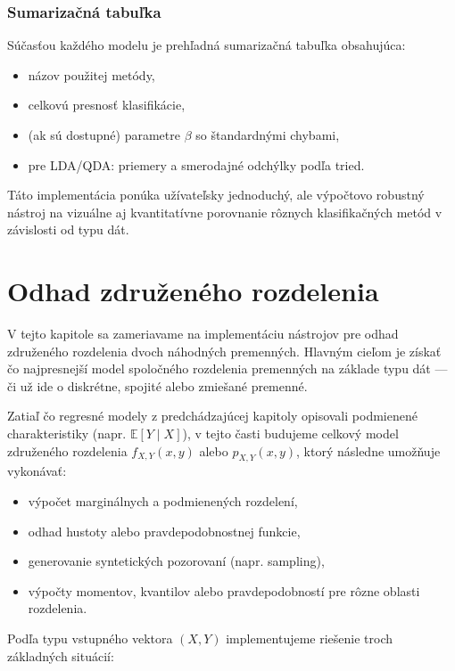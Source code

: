 \subsubsection{Sumarizačná tabuľka}

Súčasťou každého modelu je prehľadná sumarizačná tabuľka obsahujúca:

\begin{itemize}
  \item názov použitej metódy,
  \item celkovú presnosť klasifikácie,
  \item (ak sú dostupné) parametre $\beta$ so štandardnými chybami,
  \item pre LDA/QDA: priemery a smerodajné odchýlky podľa tried.
\end{itemize}

Táto implementácia ponúka užívateľsky jednoduchý, ale výpočtovo robustný nástroj na vizuálne aj kvantitatívne porovnanie rôznych klasifikačných metód v závislosti od typu dát.


\section{Odhad združeného rozdelenia}\label{sec:joint_dist_estimation}

V tejto kapitole sa zameriavame na implementáciu nástrojov pre odhad združeného rozdelenia dvoch náhodných premenných. Hlavným cieľom je získať čo najpresnejší model spoločného rozdelenia premenných na základe typu dát — či už ide o diskrétne, spojité alebo zmiešané premenné.

Zatiaľ čo regresné modely z predchádzajúcej kapitoly opisovali podmienené charakteristiky (napr. $\mathbb{E}[Y \mid X]$), v tejto časti budujeme celkový model združeného rozdelenia $f_{X,Y}(x, y)$ alebo $p_{X,Y}(x, y)$, ktorý následne umožňuje vykonávať:

\begin{itemize}
  \item výpočet marginálnych a podmienených rozdelení,
  \item odhad hustoty alebo pravdepodobnostnej funkcie,
  \item generovanie syntetických pozorovaní (napr. sampling),
  \item výpočty momentov, kvantilov alebo pravdepodobností pre rôzne oblasti rozdelenia.
\end{itemize}

Podľa typu vstupného vektora $(X, Y)$ implementujeme riešenie troch základných situácií:

